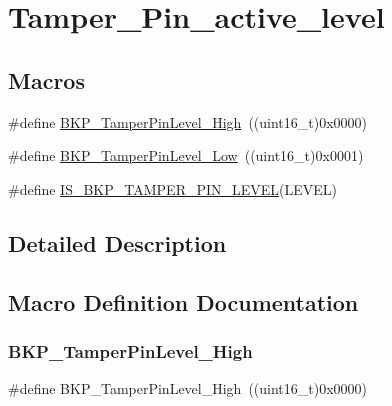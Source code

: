 \hypertarget{group___tamper___pin__active__level}{}\section{Tamper\+\_\+\+Pin\+\_\+active\+\_\+level}
\label{group___tamper___pin__active__level}
\subsection*{Macros}
\begin{DoxyCompactItemize}
\item 
\#define \mbox{\hyperlink{group___tamper___pin__active__level_gae7203c3c0202cd68d201278c8be2b967}{B\+K\+P\+\_\+\+Tamper\+Pin\+Level\+\_\+\+High}}~((uint16\+\_\+t)0x0000)
\item 
\#define \mbox{\hyperlink{group___tamper___pin__active__level_gade9fc51f494eddcc4d88679c80fe39ce}{B\+K\+P\+\_\+\+Tamper\+Pin\+Level\+\_\+\+Low}}~((uint16\+\_\+t)0x0001)
\item 
\#define \mbox{\hyperlink{group___tamper___pin__active__level_gae7cd3bd314605f7752062c814b850c23}{I\+S\+\_\+\+B\+K\+P\+\_\+\+T\+A\+M\+P\+E\+R\+\_\+\+P\+I\+N\+\_\+\+L\+E\+V\+EL}}(L\+E\+V\+EL)
\end{DoxyCompactItemize}


\subsection{Detailed Description}


\subsection{Macro Definition Documentation}
\mbox{\label{group___tamper___pin__active__level_gae7203c3c0202cd68d201278c8be2b967}} 
\subsubsection{\texorpdfstring{BKP\_TamperPinLevel\_High}{BKP\_TamperPinLevel\_High}}
{\footnotesize\ttfamily \#define B\+K\+P\+\_\+\+Tamper\+Pin\+Level\+\_\+\+High~((uint16\+\_\+t)0x0000)}

